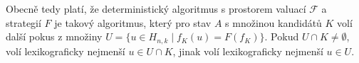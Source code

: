 Obecně tedy platí, že deterministický algoritmus s prostorem valuací $\mathcal{F}$ a strategií $F$ je takový algoritmus, který pro stav $A$ s množinou kandidátů $K$ volí další pokus z množiny $U = \{u \in H_{n,k} \mid f_K(u) = F(f_K)\}$. Pokud $U \cap K \neq \emptyset$, volí lexikograficky nejmenší $u \in U \cap K$, jinak volí lexikograficky nejmenší $u \in U$. 





    





